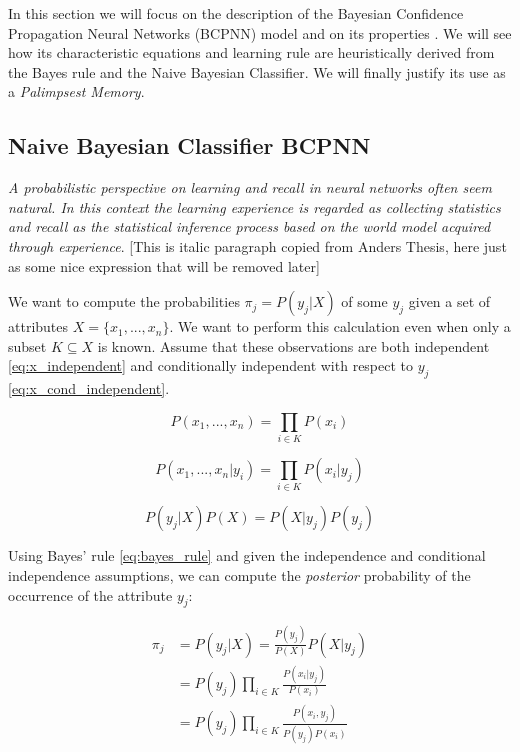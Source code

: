 In this section we will focus on the description of the Bayesian Confidence Propagation Neural Networks (BCPNN) model and on its properties \cite{sandberg2002bayesian}. We will see how its characteristic equations and learning rule are heuristically derived from the Bayes rule and the Naive Bayesian Classifier. We will finally justify its use as a \textit{Palimpsest Memory}. 

\subsection{Naive Bayesian Classifier BCPNN}
\textit{A probabilistic perspective on learning and recall in neural networks often seem natural. In this context the learning experience is regarded as collecting statistics and recall as the statistical inference process based on the world model acquired through experience}. [This is italic paragraph copied from Anders Thesis, here just as some nice expression that will be removed later]

We want to compute the probabilities $\pi_{j}=P(y_j|X)$ of some $y_j$ given  a set of attributes $X= \{x_1,...,x_n\}$. We want to perform this calculation even when only a subset $K \subseteq X$ is known. Assume that these observations are both independent \eqref{eq:x_independent} and conditionally independent with respect to $y_j$\eqref{eq:x_cond_independent}. 

\begin{equation}
    P(x_1,..., x_n) = \prod\limits_{i \in K} P(x_i)
    \label{eq:x_independent}
\end{equation}

\begin{equation}
    P(x_1,..., x_n|y_i) = \prod\limits_{i \in K} P(x_i|y_j)
    \label{eq:x_cond_independent}
\end{equation}

\begin{equation}
    P(y_j|X)P(X) = P(X|y_j)P(y_j)
    \label{eq:bayes_rule}
\end{equation}

Using Bayes' rule \eqref{eq:bayes_rule} and given the independence and conditional independence assumptions, we can compute the \textit{posterior} probability of the occurrence of the attribute $y_j$:

\begin{equation}
\begin{aligned}
    \pi_{j} & = P(y_j|X) = \frac{P(y_j)}{P(X)}P(X|y_j) \\
    & = P(y_j)\prod\limits_{i \in K}\frac{P(x_i|y_j)}{P(x_i)} \\
    & = P(y_j)\prod\limits_{i \in K}\frac{P(x_i,y_j)}{P(y_j)P(x_i)}
    \label{eq:pi_cond_mult}
\end{aligned}
\end{equation}

